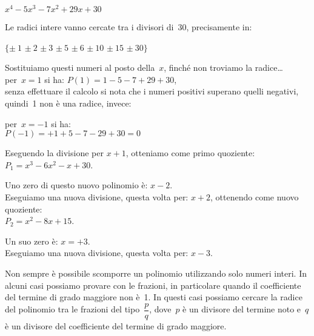 \begin{esempio}
\(x^{4}-5x^{3}-7x^{2}+29x+30\)

Le radici intere vanno cercate tra i divisori di~30, precisamente 
in:
\begin{center}
\(\{\pm~1\) \(\pm~2\) \(\pm~3\) \(\pm~5\) \(\pm~6\) \(\pm~10\)
\(\pm~15\) \(\pm~30\}\)
\end{center}
Sostituiamo questi numeri al posto della~\(x\), finché non troviamo la 
radice\dots\\
per~\(x=1\) si ha: \quad \(P(1)=1-5-7+29+30\), \\
senza effettuare il calcolo si nota 
che i numeri positivi superano quelli negativi, quindi~1 non è una radice,
invece:

{
\scompruffiniad
}
{
per~\(x=-1\) si ha:\\
\(P(-1)=+1+5-7-29+30=0\)

Eseguendo la divisione per \(x+1\), otteniamo come primo quoziente: \\
\(P_1=x^3-6x^2-x+30\).

Uno zero di questo nuovo polinomio è: \(x-2\).\\
Eseguiamo una nuova divisione, questa volta per: \(x+2\),
ottenendo come nuovo quoziente:\\
\(P_2=x^2-8x+15\). 

Un suo zero è: \(x=+3\).\\
Eseguiamo una nuova divisione, questa volta per: \(x-3\).
}
\end{esempio}

Non sempre è possibile scomporre un polinomio utilizzando solo numeri
interi. In alcuni casi possiamo provare con le frazioni, in particolare
quando il coefficiente del termine di grado maggiore non è~1. In
questi casi possiamo cercare la radice del polinomio tra le frazioni
del tipo~\(\dfrac{p}{q}\), dove~\(p\) è un divisore del termine noto e~\(q\) 
è un divisore del coefficiente del termine di grado maggiore.

